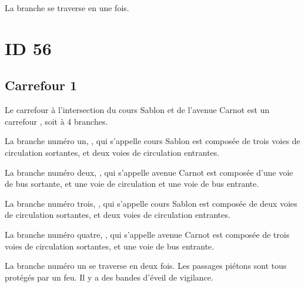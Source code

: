 \begin{appendix}
\newpar{}

La branche  se traverse en une fois. 

\newpar{}


\section*{ID 56}

\label{annexe:q_ID56}

\subsection*{Carrefour 1}

\label{annexe:q_ID56_carrefour1}

Le carrefour à l'intersection du cours Sablon et de l'avenue Carnot est un carrefour , soit à 4 branches.

\newpar{}

La branche numéro un, , qui s'appelle cours Sablon est composée de trois voies de circulation sortantes, et deux voies de circulation entrantes.

\newpar{}

La branche numéro deux, , qui s'appelle avenue Carnot est composée d'une voie de bus sortante, et une voie de circulation et une voie de bus entrante.

\newpar{}

La branche numéro trois, , qui s'appelle cours Sablon est composée de deux voies de circulation sortantes, et deux voies de circulation entrantes.

\newpar{}

La branche numéro quatre, ,  qui s'appelle avenue Carnot est composée de trois voies de circulation sortantes, et une voie de bus entrante.

\newpar{}

La branche numéro un se traverse en deux fois. Les passages piétons sont tous protégés par un feu. Il y a des bandes d'éveil de vigilance.


\end{appendix}
